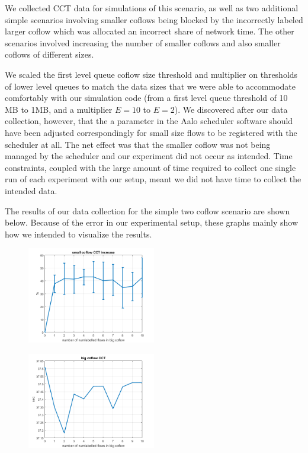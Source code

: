 \documentclass[conference]{IEEEtran}
\begin{document}
We collected CCT data for simulations of this scenario, as well as two additional simple scenarios involving smaller coflows being blocked by the incorrectly labeled larger coflow which was allocated an incorrect share of network time. The other scenarios involved increasing the number of smaller coflows and also smaller coflows of different sizes.

We scaled the first level queue coflow size threshold and multiplier on thresholds of lower level queues to match the data sizes that we were able to accommodate comfortably with our simulation code (from a first level queue threshold of 10 MB to 1MB, and a multiplier $E=10$ to $E=2$). We discovered after our data collection, however, that the a parameter in the Aalo scheduler software should have been adjusted correspondingly for small size flows to be registered with the scheduler at all. The net effect was that the smaller coflow was not being managed by the scheduler and our experiment did not occur as intended. Time constraints, coupled with the large amount of time required to collect one single run of each experiment with our setup, meant we did not have time to collect the intended data.

The results of our data collection for the simple two coflow scenario are shown below. Because of the error in our experimental setup, these graphs mainly show how we intended to visualize the results. 

\begin{figure}
\includegraphics[width=0.5\textwidth]{smallcoflow.png}
\label{figure:smallcoflow}
\end{figure}

\begin{figure}
\includegraphics[width=0.5\textwidth]{bigcoflow.png}
\label{figure:largecoflow}
\end{figure}
\end{document}
